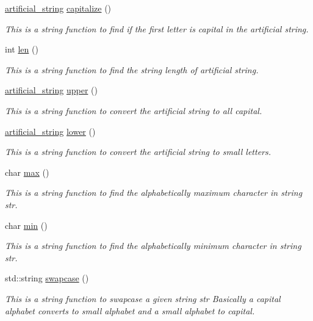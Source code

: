 \begin{DoxyCompactItemize}
\item 
\hyperlink{classartificial__string}{artificial\-\_\-string} \hyperlink{classartificial__string_a36c68ec5c9a81edd512bc9e6efe9c80f}{capitalize} ()
\begin{DoxyCompactList}\small\item\em This is a string function to find if the first letter is capital in the artificial string. \end{DoxyCompactList}\item 
int \hyperlink{classartificial__string_a63b0290f444616cb06eb1776af0d80f2}{len} ()
\begin{DoxyCompactList}\small\item\em This is a string function to find the string length of artificial string. \end{DoxyCompactList}\item 
\hyperlink{classartificial__string}{artificial\-\_\-string} \hyperlink{classartificial__string_af6e84a28ddeb314ba6bf36cee3f9f69a}{upper} ()
\begin{DoxyCompactList}\small\item\em This is a string function to convert the artificial string to all capital. \end{DoxyCompactList}\item 
\hyperlink{classartificial__string}{artificial\-\_\-string} \hyperlink{classartificial__string_a62c0582989da7db85168759750892e58}{lower} ()
\begin{DoxyCompactList}\small\item\em This is a string function to convert the artificial string to small letters. \end{DoxyCompactList}\item 
char \hyperlink{classartificial__string_a4cf090a85d3cdcbf8da89720cf0db4e1}{max} ()
\begin{DoxyCompactList}\small\item\em This is a string function to find the alphabetically maximum character in string str. \end{DoxyCompactList}\item 
char \hyperlink{classartificial__string_ab4443974192f4048eb55f3bd2e435885}{min} ()
\begin{DoxyCompactList}\small\item\em This is a string function to find the alphabetically minimum character in string str. \end{DoxyCompactList}\item 
std\-::string \hyperlink{classartificial__string_a4e218591cde8a4ac23dd63c48ca895e3}{swapcase} ()
\begin{DoxyCompactList}\small\item\em This is a string function to swapcase a given string str Basically a capital alphabet converts to small alphabet and a small alphabet to capital. \end{DoxyCompactList}\end{DoxyCompactItemize}
